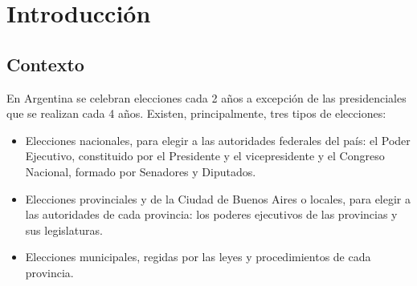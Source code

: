 \chapter{Introducción}

\label{Chapter1}

\section{Contexto}

En Argentina se celebran elecciones cada 2 años a excepción de las presidenciales que se realizan cada 4 años. Existen,
principalmente, tres tipos de elecciones:

\begin{itemize}
    \item Elecciones nacionales, para elegir a las autoridades federales del país: el Poder Ejecutivo, constituido por el
          Presidente y el vicepresidente y el Congreso Nacional, formado por Senadores y Diputados.
    \item Elecciones provinciales y de la Ciudad de Buenos Aires o locales, para elegir a las autoridades de cada provincia: los
          poderes ejecutivos de las provincias y sus legislaturas.
    \item Elecciones municipales, regidas por las leyes y procedimientos de cada provincia.
\end{itemize}

